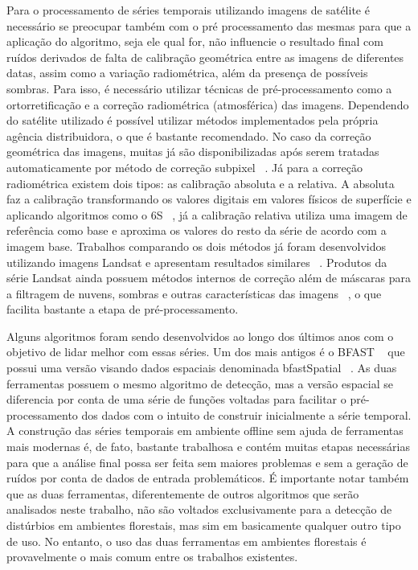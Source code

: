 \documentclass[twocolumn]{article}
\begin{document}
Para o processamento de séries temporais utilizando imagens de satélite é necessário se preocupar também com o pré processamento das mesmas para que a aplicação do algoritmo, seja ele qual for, não influencie o resultado final com ruídos derivados de falta de calibração geométrica entre as imagens de diferentes datas, assim como a variação radiométrica, além da presença de possíveis sombras. Para isso, é necessário utilizar técnicas de pré-processamento como a ortorretificação e a correção radiométrica (atmosférica) das imagens. Dependendo do satélite utilizado é possível utilizar métodos implementados pela própria agência distribuidora, o que é bastante recomendado. No caso da correção geométrica das imagens, muitas já são disponibilizadas após serem tratadas automaticamente por método de correção subpixel ~\cite{Gutjahr2014}. Já para a correção radiométrica existem dois tipos: as calibração absoluta e a relativa. A absoluta faz a calibração transformando os valores digitais em valores físicos de superfície e aplicando algoritmos como o 6S ~\cite{Sagan2004}, já a calibração relativa utiliza uma imagem de referência como base e aproxima os valores do resto da série de acordo com a imagem base. Trabalhos comparando os dois métodos já foram desenvolvidos utilizando imagens Landsat e apresentam resultados similares ~\cite{Chen2010}. Produtos da série Landsat ainda possuem métodos internos de correção além de máscaras para a filtragem de nuvens, sombras e outras características das imagens ~\cite{ZHU2015269, ZHU201283, Huang2010}, o que facilita bastante a etapa de pré-processamento.
\par
Alguns algoritmos foram sendo desenvolvidos ao longo dos últimos anos com o objetivo de lidar melhor com essas séries. Um dos mais antigos é o BFAST \sloppy  ~\cite{VERBESSELT2010106, VERBESSELT20102970, VERBESSELT201298} que possui uma versão visando dados espaciais denominada bfastSpatial ~\cite{bfastSpatial}. As duas ferramentas possuem o mesmo algoritmo de detecção, mas a versão espacial se diferencia por conta de uma série de funções voltadas para facilitar o pré-processamento dos dados com o intuito de construir inicialmente a série temporal. A construção das séries temporais em ambiente offline sem ajuda de ferramentas mais modernas é, de fato, bastante trabalhosa e contém muitas etapas necessárias para que a análise final possa ser feita sem maiores problemas e sem a geração de ruídos por conta de dados de entrada problemáticos. É importante notar também que as duas ferramentas, diferentemente de outros algoritmos que serão analisados neste trabalho, não são voltados exclusivamente para a detecção de distúrbios em ambientes florestais,  mas sim em basicamente qualquer outro tipo de uso. No entanto, o uso das duas ferramentas em ambientes florestais é provavelmente o mais comum entre os trabalhos existentes. 
\end{document}
